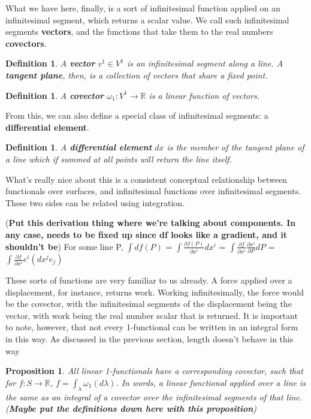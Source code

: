 \documentclass{book}
\newtheorem{defn}[equation]{Definition}
\newtheorem{prop}[equation]{Proposition}
\begin{document}
What we have here, finally, is a sort of infinitesimal function applied on an infinitesimal segment, which returns a scalar value. We call such infinitesimal segments \textbf{vectors}, and the functions that take them to the real numbers \textbf{covectors}. 

\begin{defn}
	A \textbf{vector} $v^1 \in V^1$ is an infinitesimal segment along a line. A \textbf{tangent plane}, then, is a collection of vectors that share a fixed point. 
\end{defn}


\begin{defn}
	A \textbf{covector} $\omega_1 : V^1 \to \mathbb{R}$ is a linear function of vectors. 
\end{defn}

From this, we can also define a special class of infinitesimal segments: a \textbf{differential element}. 

\begin{defn}
	A \textbf{differential element} $dx$ is the member of the tangent plane of a line which if summed at all points will return the line itself. 
\end{defn}

What's really nice about this is a consistent conceptual relationship between functionals over surfaces, and infinitesimal functions over infinitesimal segments. These two sides can be related using integration. 


(\textbf{Put this derivation thing where we're talking about components. In any case, needs to be fixed up since df looks like a gradient, and it shouldn't be})
For some line P, $\int df(P)$ = $\int \frac{\partial f(P)}{{\partial x^i}} dx^i$ = $\int \frac{\partial f}{\partial x^i}\frac{\partial x^i}{\partial P}dP$ = $\int \frac{{\partial f}}{{\partial x^i}} e^i (dx^j e_j)$


These sorts of functions are very familiar to us already. A force applied over a displacement, for instance, returns work. Working infinitesimally, the force would be the covector, with the infinitesimal segments of the displacement being the vector, with work being the real number scalar that is returned. It is important to note, however, that not every 1-functional can be written in an integral form in this way. As discussed in the previous section, length doesn't behave in this way



\begin{prop}
	All linear 1-functionals have a corresponding covector, such that for $f : S \to \mathbb{R}$, $f = \int_{\lambda} \omega_1(d\lambda)$. In words, a linear functional applied over a line is the same as an integral of a covector over the infinitesimal segments of that line. (\textbf{Maybe put the definitions down here with this proposition})
\end{prop}
\end{document}
